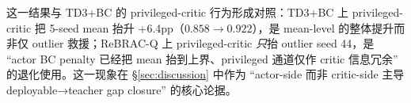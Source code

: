 这一结果与 TD3+BC 的 privileged-critic 行为形成对照：TD3+BC 上 privileged-critic 把 5-seed mean 抬升 +6.4pp（$0.858 \to 0.922$），是 mean-level 的整体提升而非仅 outlier 救援；ReBRAC-Q 上 privileged-critic \emph{只}抬 outlier seed 44，是 ``actor BC penalty 已经把 mean 抬到上界、privileged 通道仅作 critic 信息冗余'' 的退化使用。这一现象在 \S\ref{sec:discussion} 中作为 ``actor-side 而非 critic-side 主导 deployable→teacher gap closure'' 的核心论据。

